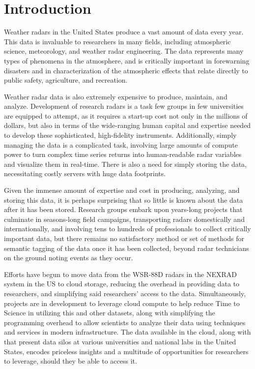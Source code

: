 \chapter{Introduction}
\label{sec:introduction}
Weather radars in the United States produce a vast amount of data every year.
This data is invaluable to researchers in many fields, including atmospheric science, meteorology, and weather radar engineering.
The data represents many types of phenomena in the atmosphere, and is critically important in forewarning disasters and in characterization of the atmospheric effects that relate directly to public safety, agriculture, and recreation.

Weather radar data is also extremely expensive to produce, maintain, and analyze.
Development of research radars is a task few groups in few universities are equipped to attempt, as it requires a start-up cost not only in the millions of dollars, but also in terms of the wide-ranging human capital and expertise needed to develop these sophisticated, high-fidelity instruments.
Additionally, simply managing the data is a complicated task, involving large amounts of compute power to turn complex time series returns into human-readable radar variables and visualize them in real-time.
There is also a need for simply storing the data, necessitating costly servers with huge data footprints.

Given the immense amount of expertise and cost in producing, analyzing, and storing this data, it is perhaps surprising that so little is known about the data after it has been stored.
Research groups embark upon years-long projects that culminate in seasons-long field campaigns, transporting radars domestically and internationally, and involving tens to hundreds of professionals to collect critically important data, but there remains no satisfactory method or set of methods for semantic tagging of the data once it has been collected, beyond radar technicians on the ground noting events as they occur.

Efforts have begun to move data from the WSR-88D radars in the NEXRAD system in the US to cloud storage, reducing the overhead in providing data to researchers, and simplifying said researchers' access to the data.
Simultaneously, projects are in development to leverage cloud compute to help reduce Time to Science in utilizing this and other datasets, along with simplifying the programming overhead to allow scientists to analyze their data using techniques and services in modern infrastructure.
The data available in the cloud, along with that present data silos at various universities and national labs in the United States, encodes priceless insights and a multitude of opportunities for researchers to leverage, should they be able to access it.

